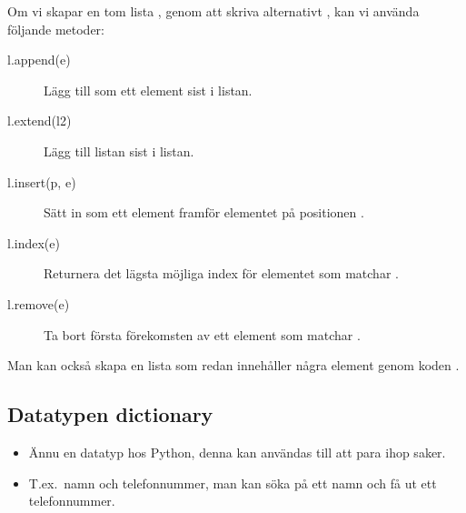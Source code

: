 \documentclass{beamer}
\begin{document}
\begin{frame}{\insertsubsectionhead}
  Om vi skapar en tom lista , genom att skriva  
  alternativt , kan vi använda följande metoder:

  \begin{description}
    \item[l.append(e)] Lägg till  som ett element sist i listan.

    \item[l.extend(l2)] Lägg till listan  sist i listan.

    \item[l.insert(p, e)] Sätt in  som ett element framför elementet på 
      positionen .

    \item[l.index(e)] Returnera det lägsta möjliga index för elementet som 
      matchar .

    \item[l.remove(e)] Ta bort första förekomsten av ett element som matchar 
      .

  \end{description}

  Man kan också skapa en lista som redan innehåller några element genom koden
  .
\end{frame}

\begin{frame}{\insertsubsectionhead}
\end{frame}

\subsection{Datatypen dictionary}

\begin{frame}{\insertsubsectionhead}
  \begin{itemize}
    \item Ännu en datatyp hos Python, denna kan användas till att para ihop 
      saker.

    \item T.ex.\ namn och telefonnummer, man kan söka på ett namn och få ut ett 
      telefonnummer.

  \end{itemize}
\end{frame}
\end{document}

